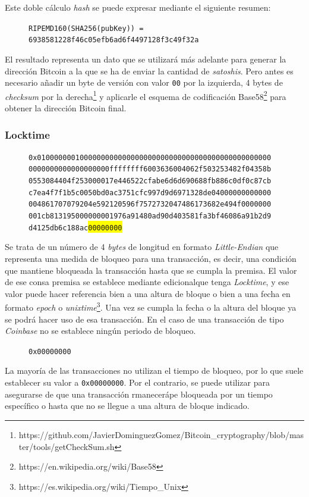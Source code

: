 \documentclass{article}
\begin{document}
    Este doble cálculo \textit{hash} se puede expresar mediante el siguiente resumen:
    
    \begin{figure}[H]
    \centering
        \scriptsize{\texttt{RIPEMD160(SHA256(pubKey)) = 6938581228f46c05efb6ad6f4497128f3c49f32a}}
    \end{figure}
    
    
    El resultado representa un dato que se utilizará más adelante para generar la dirección Bitcoin a la que se ha de enviar la cantidad de \textit{satoshis}. Pero antes es necesario añadir un byte de versión con valor \texttt{00} por la izquierda, 4 bytes de \textit{checksum} por la derecha\footnote{https://github.com/JavierDominguezGomez/Bitcoin\_cryptography/blob/master/tools/getCheckSum.sh} y aplicarle el esquema de codificación Base58\footnote{https://en.wikipedia.org/wiki/Base58} para obtener la dirección Bitcoin final.
    
    \subsubsection{Locktime}
    
    \begin{figure}[H]
        \texttt{0x0100000001000000000000000000000000000000000000000000000} \\
        \texttt{0000000000000000000ffffffff6003636004062f503253482f04358b} \\
        \texttt{0553084404f253000017e446522cfabe6d6d690688fb886c0df0c87cb} \\
        \texttt{c7ea4f7f1b5c0050bd0ac3751cfc997d9d6971328de04000000000000} \\
        \texttt{004861707079204e592120596f7572732047486173682e494f0000000} \\
        \texttt{001cb813195000000001976a91480ad90d403581fa3bf46086a91b2d9} \\
        \texttt{d4125db6c188ac\colorbox{Yellow}{00000000}}
    \end{figure}
    
    Se trata de un número de 4 \textit{bytes} de longitud en formato \textit{Little-Endian} que representa una medida de bloqueo para una transacción, es decir, una condición que mantiene bloqueada la transacción hasta que se cumpla la premisa. El valor  de ese consa premisa se establece mediante edicionalque tenga \textit{Locktime}, y ese valor puede hacer referencia bien a una altura de bloque o bien a una fecha en formato \textit{epoch} o \textit{unixtime}\footnote{https://es.wikipedia.org/wiki/Tiempo\_Unix}. Una vez se cumpla la fecha o la altura del bloque ya se podrá hacer uso de esa transacción. En el caso de una transacción de tipo \textit{Coinbase} no se establece ningún periodo de bloqueo.
    \begin{figure}[H]
        \texttt{0x00000000}
    \end{figure}
    
    La mayoría de las transacciones no utilizan el tiempo de bloqueo, por lo que suele establecer su valor a \texttt{0x00000000}. Por el contrario, se puede utilizar para asegurarse de que una transacción rmanecerápe bloqueada por un tiempo específico o hasta que no se llegue a una altura de bloque indicado.
    
\end{document}
